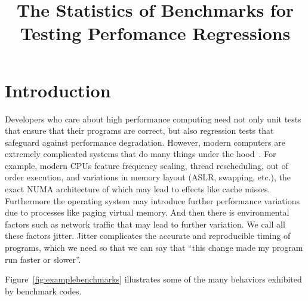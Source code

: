 \documentclass[conference]{IEEEtran}
\begin{document}
\newcommand{\TODO}[1]{\todo[inline]{#1}}
\newcommand{\TODOFIG}[1]{\missingfigure{#1}}

\title{The Statistics of Benchmarks for Testing Perfomance Regressions}

\author{
}

\maketitle

\begin{abstract}
\TODO{The abstract goes here.}
\end{abstract}

\IEEEpeerreviewmaketitle

\section{Introduction}

Developers who care about high performance computing need not only unit tests that
ensure that their programs are correct, but also regression tests that safeguard
against performance degradation. However, modern computers are extremely complicated
systems that do many things under the hood~\cite{HP5e}.
For example, modern CPUs feature frequency scaling, thread rescheduling,
out of order execution,
and variations in memory layout (ASLR, swapping, etc.), the exact NUMA architecture
of which may lead to effects like cache misses.
Furthermore the operating system may introduce further performance variations
due to processes like paging virtual memory.
And then there is environmental factors such as network traffic that may lead to
further variation. We call all these factors jitter.
Jitter complicates the accurate and reproducible timing of programs, which we
need so that we can say that ``this change made my program run faster or slower''.

Figure~\ref{fig:examplebenchmarks} illustrates some of the many behaviors exhibited by benchmark codes.
\end{document}
